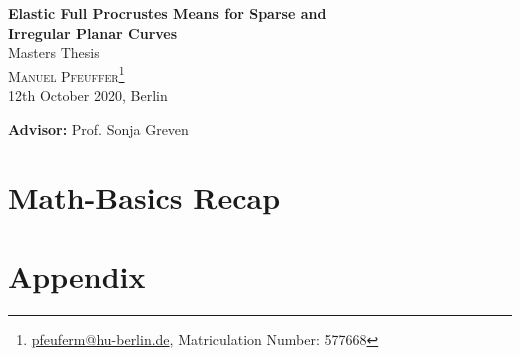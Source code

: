 \documentclass[a4paper,12pt,pagesize,DIV=calc,smallheadings,english]{article}
\begin{document}
\begin{titlepage}

  \begin{center}
    {\LARGE\textbf{Elastic Full Procrustes Means for Sparse and\vspace{0.4cm}\\
    Irregular Planar Curves}}
  \vspace{1cm}\\
  {\large Masters Thesis}
  \vspace{0.7cm}\\
  \textsc{Manuel Pfeuffer\footnote{\url{pfeuferm@hu-berlin.de}, Matriculation Number: 577668}}
  \vspace{0.1cm}\\
  12th October 2020, Berlin
  \vspace{1cm}\\

  \vfill
  \end{center}

  \noindent \textbf{Advisor:} Prof. Sonja Greven
  \vspace{0.5em}

\end{titlepage}


\tableofcontents
\newpage


\section{Math-Basics Recap}
\label{sec:intro}



\appendix
\newpage
\section{Appendix}
\label{app}



\newpage
\nocite{*}
\printbibliography[heading=bibintoc] %
\end{document}
